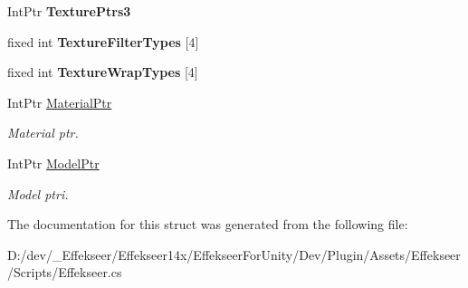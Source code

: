 \begin{DoxyCompactItemize}
\item 
\hypertarget{struct_effekseer_1_1_plugin_1_1_unity_render_parameter_afedf4fb0b43f571c09ede83a223f846e}{Int\-Ptr {\bfseries Texture\-Ptrs3}}\label{struct_effekseer_1_1_plugin_1_1_unity_render_parameter_afedf4fb0b43f571c09ede83a223f846e}

\item 
\hypertarget{struct_effekseer_1_1_plugin_1_1_unity_render_parameter_a5e9dcfc2dc90e08a42390702da8bdebc}{fixed int {\bfseries Texture\-Filter\-Types} \mbox{[}4\mbox{]}}\label{struct_effekseer_1_1_plugin_1_1_unity_render_parameter_a5e9dcfc2dc90e08a42390702da8bdebc}

\item 
\hypertarget{struct_effekseer_1_1_plugin_1_1_unity_render_parameter_aaf3732c6a6a2200af3164d628f58c22c}{fixed int {\bfseries Texture\-Wrap\-Types} \mbox{[}4\mbox{]}}\label{struct_effekseer_1_1_plugin_1_1_unity_render_parameter_aaf3732c6a6a2200af3164d628f58c22c}

\item 
\hypertarget{struct_effekseer_1_1_plugin_1_1_unity_render_parameter_a40875ca69d2b589644ca728aae9baea9}{Int\-Ptr \hyperlink{struct_effekseer_1_1_plugin_1_1_unity_render_parameter_a40875ca69d2b589644ca728aae9baea9}{Material\-Ptr}}\label{struct_effekseer_1_1_plugin_1_1_unity_render_parameter_a40875ca69d2b589644ca728aae9baea9}

\begin{DoxyCompactList}\small\item\em Material ptr. \end{DoxyCompactList}\item 
\hypertarget{struct_effekseer_1_1_plugin_1_1_unity_render_parameter_a56b941542353275011b236b01987a82f}{Int\-Ptr \hyperlink{struct_effekseer_1_1_plugin_1_1_unity_render_parameter_a56b941542353275011b236b01987a82f}{Model\-Ptr}}\label{struct_effekseer_1_1_plugin_1_1_unity_render_parameter_a56b941542353275011b236b01987a82f}

\begin{DoxyCompactList}\small\item\em Model ptri. \end{DoxyCompactList}\end{DoxyCompactItemize}


The documentation for this struct was generated from the following file\-:\begin{DoxyCompactItemize}
\item 
D\-:/dev/\-\_\-\-Effekseer/\-Effekseer14x/\-Effekseer\-For\-Unity/\-Dev/\-Plugin/\-Assets/\-Effekseer/\-Scripts/Effekseer.\-cs\end{DoxyCompactItemize}
